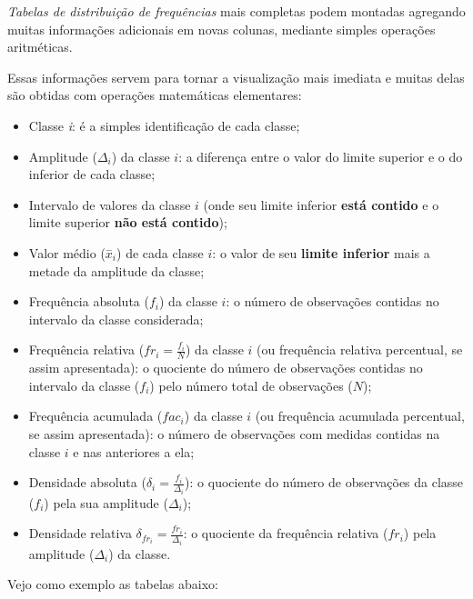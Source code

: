 \documentclass[
]{book}
\providecommand{\tightlist}{%
  \setlength{\itemsep}{0pt}\setlength{\parskip}{0pt}}
\begin{document}
\hfill\break

\emph{Tabelas de distribuição de frequências} mais completas podem montadas agregando muitas informações adicionais em novas colunas, mediante simples operações aritméticas.

\hfill\break

Essas informações servem para tornar a visualização mais imediata e muitas delas são obtidas com operações matemáticas elementares:

\hfill\break

\begin{itemize}
\tightlist
\item
  Classe \emph{i}: é a simples identificação de cada classe;
\item
  Amplitude (\(\Delta_{i}\)) da classe \(i\): a diferença entre o valor do limite superior e o do inferior de cada classe;
\item
  Intervalo de valores da classe \(i\) (onde seu limite inferior \textbf{está contido} e o limite superior \textbf{não está contido});
\item
  Valor médio (\(\stackrel{-}{x}_{i}\)) de cada classe \(i\): o valor de seu \textbf{limite inferior} mais a metade da amplitude da classe;
\item
  Frequência absoluta (\(f_{i}\)) da classe \(i\): o número de observações contidas no intervalo da classe considerada;
\item
  Frequência relativa (\(fr_{i}= \frac{f_{i}}{N}\)) da classe \(i\) (ou frequência relativa percentual, se assim apresentada): o quociente do número de observações contidas no intervalo da classe (\(f_{i}\)) pelo número total de observações (\(N\));
\item
  Frequência acumulada (\(fac_{i}\)) da classe \(i\) (ou frequência acumulada percentual, se assim apresentada): o número de observações com medidas contidas na classe \(i\) e nas anteriores a ela;
\item
  Densidade absoluta (\(\delta_{i}=\frac{f_{i}}{\Delta_{i}}\)): o quociente do número de observações da classe (\(f_{i}\)) pela sua amplitude (\(\Delta_{i}\));
\item
  Densidade relativa \(\delta_{fr_{i}}=\frac{fr_{i}}{\Delta_{i}}\): o quociente da frequência relativa (\(fr_{i}\)) pela amplitude (\(\Delta_{i}\)) da classe.
\end{itemize}

\hfill\break

Vejo como exemplo as tabelas abaixo:
\end{document}
